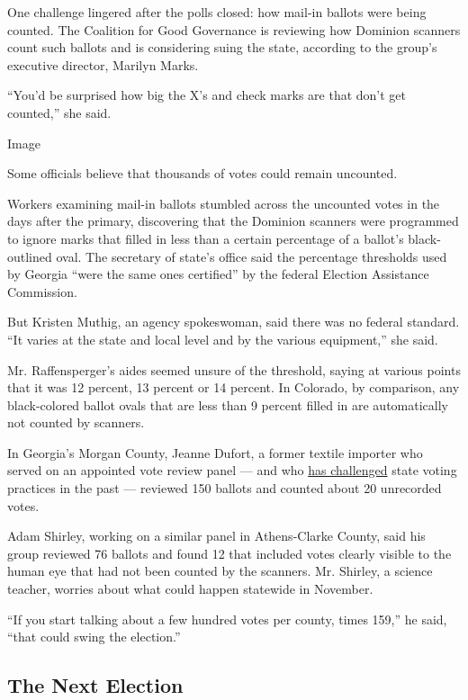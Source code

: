 One challenge lingered after the polls closed: how mail-in ballots were
being counted. The Coalition for Good Governance is reviewing how
Dominion scanners count such ballots and is considering suing the state,
according to the group's executive director, Marilyn Marks.

``You'd be surprised how big the X's and check marks are that don't get
counted,'' she said.

Image

Some officials believe that thousands of votes could remain uncounted.

Workers examining mail-in ballots stumbled across the uncounted votes in
the days after the primary, discovering that the Dominion scanners were
programmed to ignore marks that filled in less than a certain percentage
of a ballot's black-outlined oval. The secretary of state's office said
the percentage thresholds used by Georgia ``were the same ones
certified'' by the federal Election Assistance Commission.

But Kristen Muthig, an agency spokeswoman, said there was no federal
standard. ``It varies at the state and local level and by the various
equipment,'' she said.

Mr. Raffensperger's aides seemed unsure of the threshold, saying at
various points that it was 12 percent, 13 percent or 14 percent. In
Colorado, by comparison, any black-colored ballot ovals that are less
than 9 percent filled in are automatically not counted by scanners.

In Georgia's Morgan County, Jeanne Dufort, a former textile importer who
served on an appointed vote review panel --- and who
\href{https://morgancountycitizen.com/2018/10/19/resident-joins-suit-against-kemp/}{has
challenged} state voting practices in the past --- reviewed 150 ballots
and counted about 20 unrecorded votes.

Adam Shirley, working on a similar panel in Athens-Clarke County, said
his group reviewed 76 ballots and found 12 that included votes clearly
visible to the human eye that had not been counted by the scanners. Mr.
Shirley, a science teacher, worries about what could happen statewide in
November.

``If you start talking about a few hundred votes per county, times
159,'' he said, ``that could swing the election.''

\hypertarget{the-next-election}{%
\subsection{The Next Election}\label{the-next-election}}

